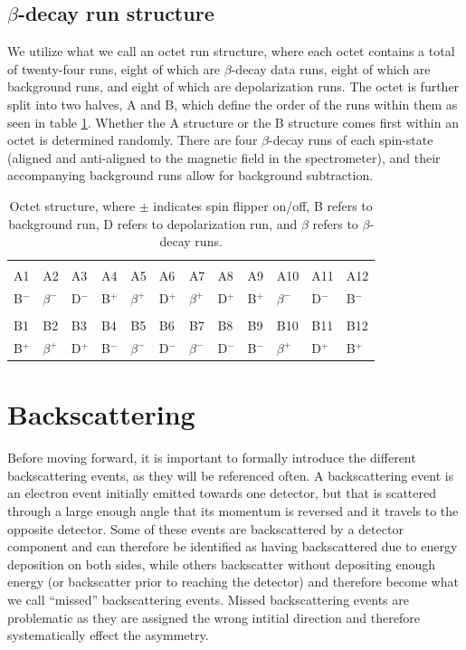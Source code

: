 \subsection{$\beta$-decay run structure}
We utilize what we call an octet run structure, where each octet contains a total of twenty-four
runs, eight of which are $\beta$-decay data runs, eight of which are background runs, and eight
of which are depolarization runs. The octet is further split into two halves, A and B, which define
the order of the runs within them as seen in table \ref{tab:octetStructure}. Whether the A structure
or the B structure comes first within an octet is determined randomly. There are four $\beta$-decay
runs of each spin-state (aligned and anti-aligned to the magnetic field in the spectrometer), and their
accompanying background runs allow for background subtraction. 

\begin{table}[h]
  \caption{Octet structure, where $\pm$ indicates spin flipper on/off,
    B refers to background run, D refers to depolarization run, and $\beta$
    refers to $\beta$-decay runs.} 
  \centering
  \begin{tabular}{llllllllllll}
    \hline \hline \\ [-1.75ex]
    A1 & A2 & A3 & A4 & A5 & A6 & A7 & A8 & A9 & A10 & A11 & A12 \\ 
    B$^-$ & $\beta^-$ & D$^-$ & B$^+$ & $\beta^+$ & D$^+$ & $\beta^+$ & D$^+$ & B$^+$ & $\beta^-$ & D$^-$ & B$^-$ \\
    \hline \\ [-1.75ex]
    B1 & B2 & B3 & B4 & B5 & B6 & B7 & B8 & B9 & B10 & B11 & B12 \\
    B$^+$ & $\beta^+$ & D$^+$ & B$^-$ & $\beta^-$ & D$^-$ & $\beta^-$ & D$^-$ & B$^-$ & $\beta^+$ & D$^+$ & B$^+$ \\
    \hline
  \end{tabular}
  \label{tab:octetStructure}
\end{table}



\section{Backscattering} \label{sec:backscattering}
Before moving forward, it is important to formally introduce the different
backscattering events, as they will be referenced often. A backscattering
event is an electron event initially emitted towards one detector, but that
is scattered through a large enough angle that its momentum is reversed and
it travels to the opposite detector. Some of these events are backscattered
by a detector component and can therefore be identified as having backscattered
due to energy deposition on both sides,
while others backscatter without depositing enough energy (or backscatter prior
to reaching the detector) and therefore become what we call ``missed''
backscattering events. Missed backscattering events are problematic as they
are assigned the wrong intitial direction and therefore systematically effect
the asymmetry.

